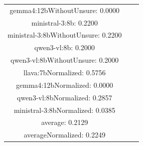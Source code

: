 \documentclass[a4paper]{article}
\begin{document}
\begin{tabular}{ccc}
gemma4:12bWithoutUnsure: 0.0000 \\ ministral-3:8b: 0.2200 \\ ministral-3:8bWithoutUnsure: 0.2200 \\ qwen3-vl:8b: 0.2000 \\ qwen3-vl:8bWithoutUnsure: 0.2000 \\ llava:7bNormalized: 0.5756 \\ gemma4:12bNormalized: 0.0000 \\ qwen3-vl:8bNormalized: 0.2857 \\ ministral-3:8bNormalized: 0.0385 \\ average: 0.2129 \\ averageNormalized: 0.2249 \end{minipage}\\
\end{tabular}

\vspace{5mm}
\end{document}
